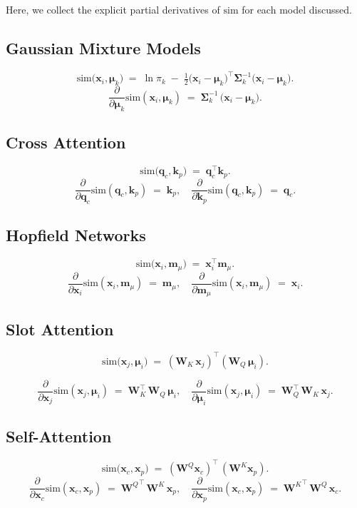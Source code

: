 \documentclass{article}
\begin{document}
Here, we collect the explicit partial derivatives of \(\mathrm{sim}\) for each model discussed.

\subsection*{Gaussian Mixture Models}
\[
\mathrm{sim}\bigl(\bm{x}_i, \bm{\mu}_k\bigr)
\;=\;
\ln \pi_k
\;-\;
\tfrac12 \bigl(\bm{x}_i - \bm{\mu}_k\bigr)^\top
\bm{\Sigma}_k^{-1}
\bigl(\bm{x}_i - \bm{\mu}_k\bigr).
\]
\[
\frac{\partial}{\partial \bm{\mu}_k} \mathrm{sim}(\bm{x}_i,\bm{\mu}_k)
\;=\;
\bm{\Sigma}_k^{-1}\,\bigl(\bm{x}_i - \bm{\mu}_k\bigr).
\]

\subsection*{Cross Attention}
\[
\mathrm{sim}\bigl(\bm{q}_c, \bm{k}_p\bigr)
\;=\;
\bm{q}_c^\top \bm{k}_p.
\]
\[
\frac{\partial}{\partial \bm{q}_c} \mathrm{sim}(\bm{q}_c,\bm{k}_p)
\;=\;
\bm{k}_p,
\quad
\frac{\partial}{\partial \bm{k}_p} \mathrm{sim}(\bm{q}_c,\bm{k}_p)
\;=\;
\bm{q}_c.
\]

\subsection*{Hopfield Networks}
\[
\mathrm{sim}\bigl(\bm{x}_i, \bm{m}_\mu\bigr)
\;=\;
\bm{x}_i^\top \bm{m}_\mu.
\]
\[
\frac{\partial}{\partial \bm{x}_i} \mathrm{sim}(\bm{x}_i,\bm{m}_\mu)
\;=\;
\bm{m}_\mu,
\quad
\frac{\partial}{\partial \bm{m}_\mu} \mathrm{sim}(\bm{x}_i,\bm{m}_\mu)
\;=\;
\bm{x}_i.
\]

\subsection*{Slot Attention}
\[
\mathrm{sim}\bigl(\bm{x}_j,\bm{\mu}_i\bigr)
\;=\;
(\bm{W}_K\,\bm{x}_j)^\top
(\bm{W}_Q\,\bm{\mu}_i).
\]

\[
\frac{\partial}{\partial \bm{x}_j} \mathrm{sim}(\bm{x}_j,\bm{\mu}_i)
\;=\;
\bm{W}_K^\top \,\bm{W}_Q\,\bm{\mu}_i,
\quad
\frac{\partial}{\partial \bm{\mu}_i} \mathrm{sim}(\bm{x}_j,\bm{\mu}_i)
\;=\;
\bm{W}_Q^\top \,\bm{W}_K\,\bm{x}_j.
\]

\subsection*{Self-Attention}
\[
\mathrm{sim}\bigl(\bm{x}_c,\bm{x}_p\bigr)
\;=\;
(\bm{W}^Q \bm{x}_c)^\top\,(\bm{W}^K \bm{x}_p).
\]
\[
\frac{\partial}{\partial \bm{x}_c} \mathrm{sim}(\bm{x}_c,\bm{x}_p)
\;=\;
{\bm{W}^Q}^\top\,\bm{W}^K\,\bm{x}_p,
\quad
\frac{\partial}{\partial \bm{x}_p} \mathrm{sim}(\bm{x}_c,\bm{x}_p)
\;=\;
{\bm{W}^K}^\top\,\bm{W}^Q\,\bm{x}_c.
\]
\end{document}
